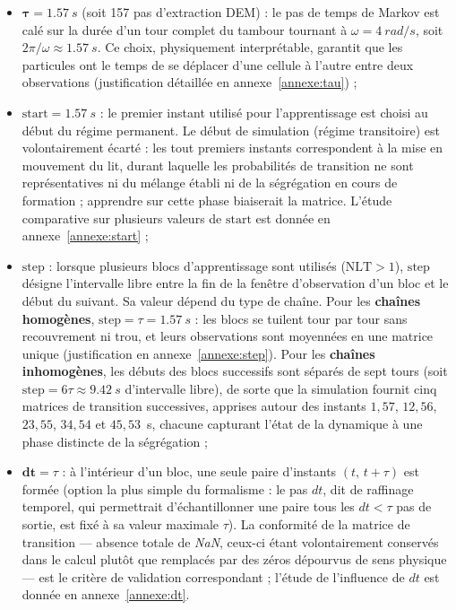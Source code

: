 \documentclass[french]{MemoireMaster}
\begin{document}
\begin{itemize}[itemsep=3pt]
  \item $\boldsymbol{\tau} = \SI{1.57}{s}$ (soit 157 pas d'extraction DEM) : le pas de temps de Markov est calé sur la durée d'un tour complet du tambour tournant à $\omega = \SI{4}{rad/s}$, soit $2\pi/\omega \approx \SI{1.57}{s}$. Ce choix, physiquement interprétable, garantit que les particules ont le temps de se déplacer d'une cellule à l'autre entre deux observations (justification détaillée en annexe~\ref{annexe:tau}) ;
  \item $\boldsymbol{\mathrm{start}} = \SI{1.57}{s}$ : le premier instant utilisé pour l'apprentissage est choisi au début du régime permanent. Le début de simulation (régime transitoire) est volontairement écarté : les tout premiers instants correspondent à la mise en mouvement du lit, durant laquelle les probabilités de transition ne sont représentatives ni du mélange établi ni de la ségrégation en cours de formation ; apprendre sur cette phase biaiserait la matrice. L'étude comparative sur plusieurs valeurs de $\mathrm{start}$ est donnée en annexe~\ref{annexe:start} ;
  \item $\boldsymbol{\mathrm{step}}$ : lorsque plusieurs blocs d'apprentissage sont utilisés ($\mathrm{NLT} > 1$), $\mathrm{step}$ désigne l'intervalle libre entre la fin de la fenêtre d'observation d'un bloc et le début du suivant. Sa valeur dépend du type de chaîne. Pour les \textbf{chaînes homogènes}, $\mathrm{step} = \tau = \SI{1.57}{s}$ : les blocs se tuilent tour par tour sans recouvrement ni trou, et leurs observations sont moyennées en une matrice unique (justification en annexe~\ref{annexe:step}). Pour les \textbf{chaînes inhomogènes}, les débuts des blocs successifs sont séparés de sept tours (soit $\mathrm{step} = 6\tau \approx \SI{9.42}{s}$ d'intervalle libre), de sorte que la simulation fournit cinq matrices de transition successives, apprises autour des instants $1{,}57$, $12{,}56$, $23{,}55$, $34{,}54$ et $45{,}53$~s, chacune capturant l'état de la dynamique à une phase distincte de la ségrégation ;
  \item $\boldsymbol{dt} = \tau$ : à l'intérieur d'un bloc, une seule paire d'instants $(t,\, t+\tau)$ est formée (option la plus simple du formalisme : le pas \(dt\), dit de raffinage temporel, qui permettrait d'échantillonner une paire tous les $dt < \tau$ pas de sortie, est fixé à sa valeur maximale $\tau$). La conformité de la matrice de transition --- absence totale de \textit{NaN}, ceux-ci étant volontairement conservés dans le calcul plutôt que remplacés par des zéros dépourvus de sens physique --- est le critère de validation correspondant ; l'étude de l'influence de $dt$ est donnée en annexe~\ref{annexe:dt}.
\end{itemize}
\end{document}

